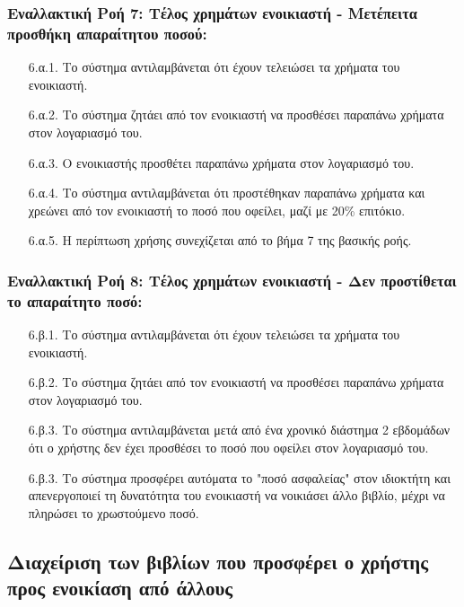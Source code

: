 \documentclass[12pt,a4paper]{article}
\begin{document}
\subsubsection*{Εναλλακτική Ροή 7: Τέλος χρημάτων ενοικιαστή - Μετέπειτα προσθήκη απαραίτητου ποσού:}
\begin{enumerate}
    \item[6.α.1.] Το σύστημα αντιλαμβάνεται ότι έχουν τελειώσει τα χρήματα του ενοικιαστή.
    \item[6.α.2.] Το σύστημα ζητάει από τον ενοικιαστή να προσθέσει παραπάνω χρήματα στον λογαριασμό του.
    \item[6.α.3.] Ο ενοικιαστής προσθέτει παραπάνω χρήματα στον λογαριασμό του.
    \item[6.α.4.] Το σύστημα αντιλαμβάνεται ότι προστέθηκαν παραπάνω χρήματα και χρεώνει από τον ενοικιαστή το ποσό που οφείλει, μαζί με 20\% επιτόκιο.
    \item[6.α.5.] Η περίπτωση χρήσης συνεχίζεται από το βήμα 7 της βασικής ροής.
\end{enumerate}

\subsubsection*{Εναλλακτική Ροή 8: Τέλος χρημάτων ενοικιαστή - Δεν προστίθεται το απαραίτητο ποσό:}
\begin{enumerate}
    \item[6.β.1.] Το σύστημα αντιλαμβάνεται ότι έχουν τελειώσει τα χρήματα του ενοικιαστή.
    \item[6.β.2.] Το σύστημα ζητάει από τον ενοικιαστή να προσθέσει παραπάνω χρήματα στον λογαριασμό του.
    \item[6.β.3.] Το σύστημα αντιλαμβάνεται μετά από ένα χρονικό διάστημα 2 εβδομάδων ότι ο χρήστης δεν έχει προσθέσει το ποσό που οφείλει στον λογαριασμό του.
    \item[6.β.3.] Το σύστημα προσφέρει αυτόματα το "ποσό ασφαλείας" στον ιδιοκτήτη και απενεργοποιεί τη δυνατότητα του ενοικιαστή να νοικιάσει άλλο βιβλίο, μέχρι να πληρώσει το χρωστούμενο ποσό.
\end{enumerate}

\subsection{Διαχείριση των βιβλίων που προσφέρει ο χρήστης προς ενοικίαση από άλλους}
\end{document}
